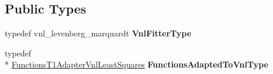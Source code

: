 \subsection*{Public Types}
\begin{DoxyCompactItemize}
\item 
\hypertarget{class_ox_1_1_fitter_levenberg_marquardt_vnl_a29b41024daba2cf8fd6db16a721c3fe5}{typedef vnl\-\_\-levenberg\-\_\-marquardt {\bfseries Vnl\-Fitter\-Type}}\label{class_ox_1_1_fitter_levenberg_marquardt_vnl_a29b41024daba2cf8fd6db16a721c3fe5}

\item 
\hypertarget{class_ox_1_1_fitter_levenberg_marquardt_vnl_a3fd4d3dc03e0c6f165b709c20f3206df}{typedef \\*
\hyperlink{class_ox_1_1_functions_t1_adapter_vnl_least_squares}{Functions\-T1\-Adapter\-Vnl\-Least\-Squares} {\bfseries Functions\-Adapted\-To\-Vnl\-Type}}\label{class_ox_1_1_fitter_levenberg_marquardt_vnl_a3fd4d3dc03e0c6f165b709c20f3206df}

\end{DoxyCompactItemize}
